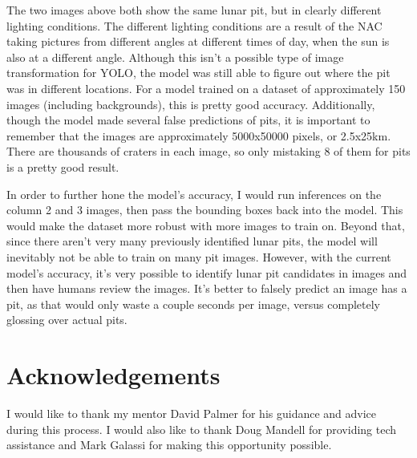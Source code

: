 \documentclass[twoside,10pt]{article}
\begin{document}
The two images above both show the same lunar pit, but in clearly different lighting conditions. The different lighting conditions are a result of the NAC taking pictures from different angles at different times of day, when the sun is also at a different angle. Although this isn't a possible type of image transformation for YOLO, the model was still able to figure out where the pit was in different locations. For a model trained on a dataset of approximately 150 images (including backgrounds), this is pretty good accuracy. Additionally, though the model made several false predictions of pits, it is important to remember that the images are approximately 5000x50000 pixels, or 2.5x25km. There are thousands of craters in each image, so only mistaking 8 of them for pits is a pretty good result.

In order to further hone the model's accuracy, I would run inferences on the column 2 and 3 images, then pass the bounding boxes back into the model. This would make the dataset more robust with more images to train on. Beyond that, since there aren't very many previously identified lunar pits, the model will inevitably not be able to train on many pit images. However, with the current model's accuracy, it's very possible to identify lunar pit candidates in images and then have humans review the images. It's better to falsely predict an image has a pit, as that would only waste a couple seconds per image, versus completely glossing over actual pits.

\section{Acknowledgements}
\fontsize{11}{13}\selectfont

I would like to thank my mentor David Palmer for his guidance and advice during this process. I would also like to thank Doug Mandell for providing tech assistance and Mark Galassi for making this opportunity possible.



\printbibliography  %
\end{document}
